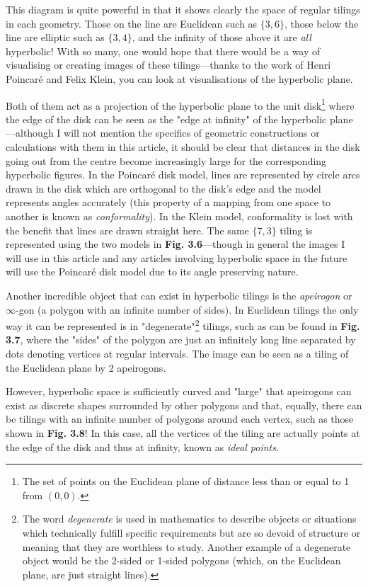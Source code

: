 \begin{multicols}{2}

This diagram is quite powerful in that it shows clearly the space of regular tilings in each geometry. Those on the line are Euclidean such as \(\{3,6\}\), those below the line are elliptic such as \(\{3,4\}\), and the infinity of those above it are \textit{all} hyperbolic! With so many, one would hope that there would be a way of visualising or creating images of these tilings---thanks to the work of Henri Poincar\'{e} and Felix Klein, you can look at visualisations of the hyperbolic plane.

Both of them act as a projection of the hyperbolic plane to the unit disk\footnote{The set of points on the Euclidean plane of distance less than or equal to 1 from \((0,0)\).} where the edge of the disk can be seen as the "edge at infinity" of the hyperbolic plane---although I will not mention the specifics of geometric constructions or calculations with them in this article, it should be clear that distances in the disk going out from the centre become increasingly large for the corresponding hyperbolic figures. In the Poincar\'{e} disk model, lines are represented by circle arcs drawn in the disk which are orthogonal to the disk's edge and the model represents angles accurately (this property of a mapping from one space to another is known as \textit{conformality}). In the Klein model, conformality is lost with the benefit that lines are drawn straight here. The same \(\{7,3\}\) tiling is represented using the two models in \textbf{Fig. 3.6}---though in general the images I will use in this article and any articles involving hyperbolic space in the future will use the Poincar\'{e} disk model due to its angle preserving nature.

Another incredible object that can exist in hyperbolic tilings is the \textit{apeirogon} or \(\infty\)-gon (a polygon with an infinite number of sides). In Euclidean tilings the only way it can be represented is in "degenerate"\footnote{The word \textit{degenerate} is used in mathematics to describe objects or situations which technically fulfill specific requirements but are so devoid of structure or meaning that they are worthless to study. Another example of a degenerate object would be the 2-sided or 1-sided polygons (which, on the Euclidean plane, are just straight lines).} tilings, such as can be found in \textbf{Fig. 3.7}, where the "sides" of the polygon are just an infinitely long line separated by dots denoting vertices at regular intervals. The image can be seen as a tiling of the Euclidean plane by 2 apeirogons.

However, hyperbolic space is sufficiently curved and "large" that apeirogons can exist as discrete shapes surrounded by other polygons and that, equally, there can be tilings with an infinite number of polygons around each vertex, such as those shown in \textbf{Fig. 3.8}! In this case, all the vertices of the tiling are actually points at the edge of the disk and thus at infinity, known as \textit{ideal points}.

\end{multicols}

